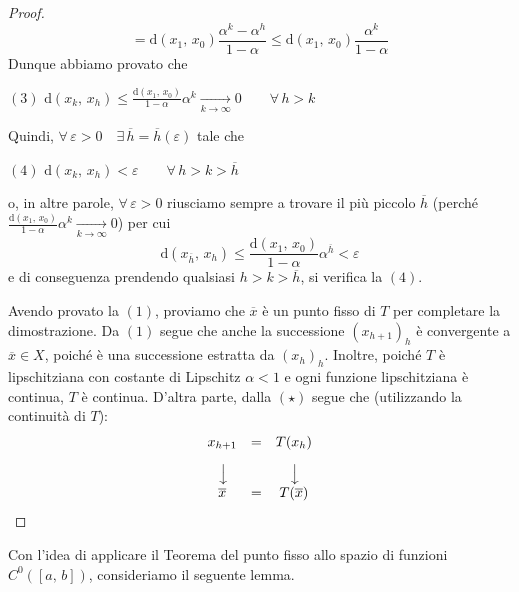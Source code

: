 \begin{proof}
$$$$
$$
= \mathrm{d}(x_1,\,x_0) \dfrac{\alpha^{k}-\alpha^h}{1-\alpha} \leq
\mathrm{d}(x_1,\,x_0) \dfrac{\alpha^{k}}{1-\alpha}
$$
Dunque abbiamo provato che
\begin{center}
$\mathrm{(3)}$
\hfill
$\displaystyle
\mathrm{d}(x_k,\,x_h) \leq \frac{\mathrm{d}(x_1,\,x_0)}{1-\alpha} \alpha^{k} \underset{k \rightarrow \infty}{\longrightarrow} 0 \qquad \forall \, h > k
$
\hfill \null \\
\end{center}
Quindi, $\forall \, \varepsilon > 0 \quad \exists \, \overline{h} = \overline{h}(\varepsilon)$ tale che 
\begin{center}
$\mathrm{(4)}$
\hfill
$\displaystyle
\mathrm{d}(x_k,\,x_h) < \varepsilon \qquad \forall \, h>k>\overline{h}
$
\hfill \null \\
\end{center}
o, in altre parole, $\forall \, \varepsilon > 0$ riusciamo sempre a trovare il più piccolo $\overline{h}$ (perché $\frac{\mathrm{d}(x_1,\,x_0)}{1-\alpha} \alpha^{k} \underset{k \rightarrow \infty}{\longrightarrow} 0$) per cui
$$
\mathrm{d}(x_{\overline{h}},\,x_h) \leq \frac{\mathrm{d}(x_1,\,x_0)}{1-\alpha} \alpha^{\overline{h}} < \varepsilon
$$
e di conseguenza prendendo qualsiasi $h>k>\overline{h}$, si verifica la $\mathrm{(4)}$.

Avendo provato la $\mathrm{(1)}$, proviamo che $\overline{x}$ è un punto fisso di $T$ per completare la dimostrazione. Da $\mathrm{(1)}$ segue che anche la successione $(x_{h+1})_h$ è convergente a $\overline{x} \in X$, poiché è una successione estratta da $(x_h)_h$. Inoltre, poiché $T$ è lipschitziana con costante di Lipschitz $\alpha < 1$ e ogni funzione lipschitziana è continua, $T$ è continua. D'altra parte, dalla $\mathrm{(\star)}$ segue che (utilizzando la continuità di $T$):
$$
\begin{array}{ccc}
x_{h+1} &=& T(x_h)\\
\rotatebox{270}{$\longrightarrow$} & & \rotatebox{270}{$\longrightarrow$}\\
\overline{x} &=& T(\overline{x})\\
\end{array}
$$
\end{proof}

Con l'idea di applicare il Teorema del punto fisso allo spazio di funzioni $C^0([a,\,b])$, consideriamo il seguente lemma.

